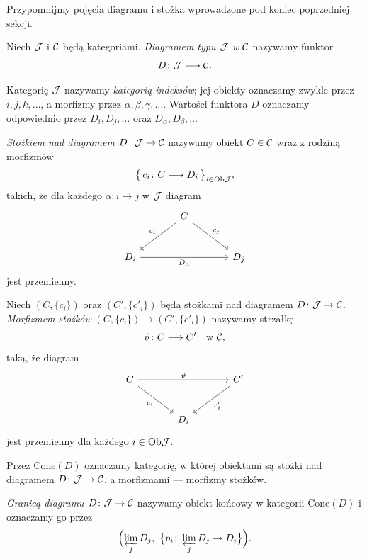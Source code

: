 Przypomnijmy pojęcia diagramu i stożka wprowadzone pod koniec poprzedniej sekcji.

\begin{definicja}
Niech $\mathcal{J}$ i $\mathcal{C}$ będą kategoriami. \emph{Diagramem typu $\mathcal{J}$ w $\mathcal{C}$} nazywamy funktor
\[
D \colon \mathcal{J} \longrightarrow \mathcal{C}.
\]
\end{definicja}

\begin{uwaga}
Kategorię $\mathcal{J}$ nazywamy \emph{kategorią indeksów}; jej obiekty oznaczamy zwykle przez $i, j, k, \dots$, a morfizmy przez $\alpha, \beta, \gamma, \dots$. Wartości funktora $D$ oznaczamy odpowiednio przez $D_i, D_j, \dots$ oraz $D_\alpha, D_\beta, \dots$
\end{uwaga}

\begin{definicja}
\emph{Stożkiem nad diagramem $D \colon \mathcal{J} \to \mathcal{C}$} nazywamy obiekt $C \in \mathcal{C}$ wraz z rodziną morfizmów
\[
\bigl\{\, c_i \colon C \longrightarrow D_i \,\bigr\}_{i \in \mathrm{Ob} \mathcal{J}},
\]
takich, że dla każdego $\alpha \colon i \to j$ w $\mathcal{J}$ diagram
\[
\begin{tikzcd}[row sep=large, column sep=large]
 & C \arrow[dl, "c_i"'] \arrow[dr, "c_j"] & \\
 D_i \arrow[rr, "D_\alpha"'] & & D_j
\end{tikzcd}
\]
jest przemienny.
\end{definicja}

\begin{definicja}
Niech $(C, \{c_i\})$ oraz $(C', \{c'_i\})$ będą stożkami nad diagramem $D \colon \mathcal{J} \to \mathcal{C}$. \emph{Morfizmem stożków} $(C, \{c_i\}) \to (C', \{c'_i\})$ nazywamy strzałkę
\[
\vartheta \colon C \longrightarrow C' \quad \text{w } \mathcal{C},
\]
taką, że diagram
\[
\begin{tikzcd}[row sep=large, column sep=large]
C \arrow[rr, "\vartheta"] \arrow[dr, "c_i"'] & & C' \arrow[dl, "c'_i"] \\
 & D_i &
\end{tikzcd}
\]
jest przemienny dla każdego $i \in \mathrm{Ob} \mathcal{J}$.
\end{definicja}

\begin{definicja}
Przez $\mathrm{Cone}(D)$ oznaczamy kategorię, w której obiektami są stożki nad diagramem $D \colon \mathcal{J} \to \mathcal{C}$, a morfizmami --- morfizmy stożków.
\end{definicja}

\begin{definicja}
\emph{Granicą diagramu $D \colon \mathcal{J} \to \mathcal{C}$} nazywamy obiekt końcowy w kategorii $\mathrm{Cone}(D)$ i oznaczamy go przez
\[
\Bigl( \varprojlim_{j} D_j,\ \bigl\{ p_i \colon \varprojlim_{j} D_j \to D_i \bigr\} \Bigr).
\]
\end{definicja}

